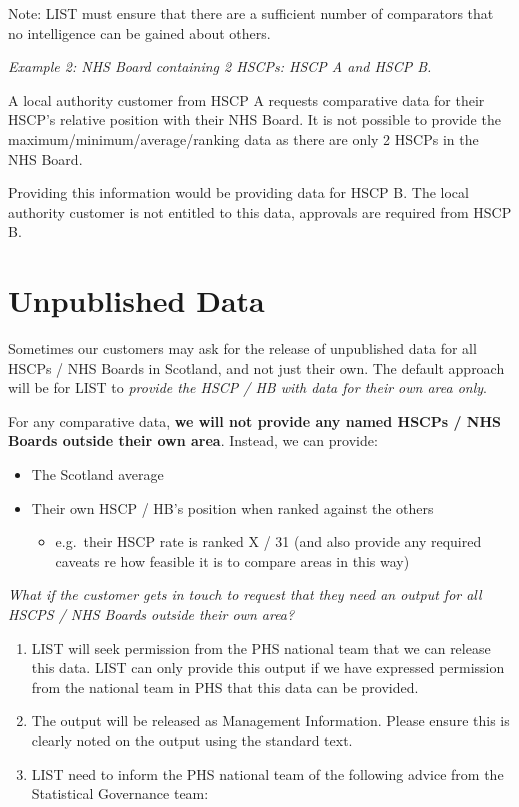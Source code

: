 \documentclass[
]{book}
\providecommand{\tightlist}{%
  \setlength{\itemsep}{0pt}\setlength{\parskip}{0pt}}
\begin{document}
Note: LIST must ensure that there are a sufficient number of comparators that no intelligence can be gained about others.

\emph{Example 2: NHS Board containing 2 HSCPs: HSCP A and HSCP B.}

A local authority customer from HSCP A requests comparative data for their HSCP's relative position with their NHS Board. It is not possible to provide the maximum/minimum/average/ranking data as there are only 2 HSCPs in the NHS Board.

Providing this information would be providing data for HSCP B. The local authority customer is not entitled to this data, approvals are required from HSCP B.

\hypertarget{unpublished-data}{%
\section{Unpublished Data}\label{unpublished-data}}

Sometimes our customers may ask for the release of unpublished data for all HSCPs / NHS Boards in Scotland, and not just their own. The default approach will be for LIST to \emph{provide the HSCP / HB with data for their own area only}.

For any comparative data, \textbf{we will not provide any named HSCPs / NHS Boards outside their own area}. Instead, we can provide:

\begin{itemize}
\item
  The Scotland average
\item
  Their own HSCP / HB's position when ranked against the others

  \begin{itemize}
  \tightlist
  \item
    e.g.~their HSCP rate is ranked X / 31 (and also provide any required caveats re how feasible it is to compare areas in this way)
  \end{itemize}
\end{itemize}

\emph{What if the customer gets in touch to request that they need an output for all HSCPS / NHS Boards outside their own area?}

\begin{enumerate}
\def\labelenumi{\arabic{enumi}.}
\item
  LIST will seek permission from the PHS national team that we can release this data. LIST can only provide this output if we have expressed permission from the national team in PHS that this data can be provided.
\item
  The output will be released as Management Information. Please ensure this is clearly noted on the output using the standard text.
\item
  LIST need to inform the PHS national team of the following advice from the Statistical Governance team:
\end{enumerate}
\end{document}
